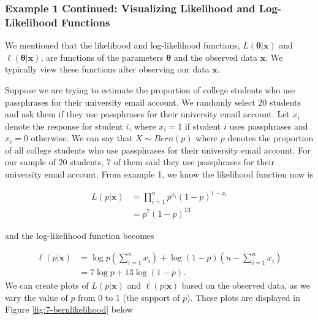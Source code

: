 \documentclass[
]{book}
\begin{document}
\subsubsection{Example 1 Continued: Visualizing Likelihood and Log-Likelihood Functions}\label{example-1-continued-visualizing-likelihood-and-log-likelihood-functions}

We mentioned that the likelihood and log-likelihood functions, \(L(\boldsymbol{\theta} | \boldsymbol{x} )\) and \(\ell(\boldsymbol{\theta} | \boldsymbol{x} )\), are functions of the parameters \(\boldsymbol{\theta}\) and the observed data \(\boldsymbol{x}\). We typically view these functions after observing our data \(\boldsymbol{x}\).

Suppose we are trying to estimate the proportion of college students who use passphrases for their university email account. We randomly select 20 students and ask them if they use passphrases for their university email account. Let \(x_i\) denote the response for student \(i\), where \(x_i = 1\) if student \(i\) uses passphrases and \(x_i=0\) otherwise. We can say that \(X \sim Bern(p)\) where \(p\) denotes the proportion of all college students who use passphrases for their university email account. For our sample of 20 students, 7 of them said they use passphrases for their university email account. From example 1, we know the likelihood function now is

\[
\begin{split}
L(p | \boldsymbol{x} ) &= \prod_{i=1}^n p^{x_i} (1-p)^{1-x_i} \\
                       &= p^7 (1-p)^{13}
\end{split}
\]

and the log-likelihood function becomes

\[
\begin{split}
\ell (p | \boldsymbol{x}) &= \log p \left(\sum_{i=1}^n x_i \right) + \log (1-p) \left( n - \sum_{i=1}^n x_i \right)\\
                          &= 7 \log p + 13 \log(1-p).
\end{split}
\]
We can create plots of \(L(p | \boldsymbol{x} )\) and \(\ell(p | \boldsymbol{x} )\) based on the observed data, as we vary the value of \(p\) from 0 to 1 (the support of \(p\)). These plots are displayed in Figure \ref{fig:7-bernlikelihood} below
\end{document}

